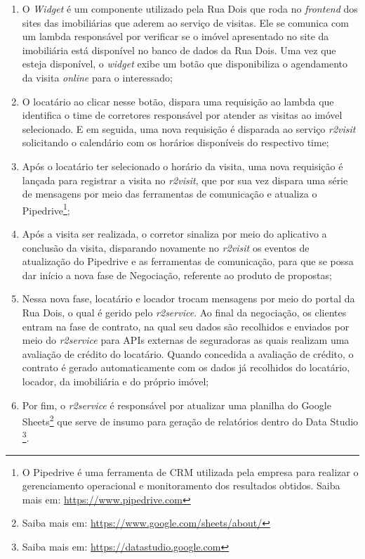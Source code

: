   \begin{enumerate}
    \item O \textit{Widget} é um componente utilizado pela Rua Dois que roda
      no \textit{frontend} dos sites das imobiliárias que aderem ao serviço
      de visitas. Ele se comunica com um lambda responsável por verificar se
      o imóvel apresentado no site da imobiliária está disponível no banco
      de dados da Rua Dois. Uma vez que esteja disponível, o \textit{widget}
      exibe um botão que disponibiliza o agendamento da visita \textit{online}
      para o interessado;
    \item O locatário ao clicar nesse botão, dispara uma requisição ao lambda
    que identifica o time de corretores responsável por atender as visitas
    ao imóvel selecionado. E em seguida, uma nova requisição é disparada ao
    serviço \textit{r2visit} solicitando o calendário com os horários
    disponíveis do respectivo time;
    \item Após o locatário ter selecionado o horário da visita, uma nova
    requisição é lançada para registrar a visita no \textit{r2visit}, que por
    sua vez dispara uma série de mensagens por meio das ferramentas de comunicação
    e atualiza o Pipedrive\footnote{O Pipedrive é uma ferramenta de \gls{CRM} utilizada pela
    empresa para realizar o gerenciamento operacional e monitoramento dos resultados obtidos.
    Saiba mais em: \url{https://www.pipedrive.com}};
    \item Após a visita ser realizada, o corretor sinaliza por meio do aplicativo
    a conclusão da visita, disparando novamente no \textit{r2visit} os eventos
    de atualização do Pipedrive e as ferramentas de comunicação, para que se
    possa dar início a nova fase de Negociação, referente ao produto de propostas;
    \item Nessa nova fase, locatário e locador trocam mensagens por meio do portal
    da Rua Dois, o qual é gerido pelo \textit{r2service}. Ao final da negociação,
    os clientes entram na fase de contrato, na qual seu dados são recolhidos e
    enviados por meio do \textit{r2service} para \glspl{API} externas de seguradoras as quais
    realizam uma avaliação de crédito do locatário. Quando concedida a avaliação
    de crédito, o contrato é gerado automaticamente com os dados já recolhidos
    do locatário, locador, da imobiliária e do próprio imóvel;
    \item Por fim, o \textit{r2service} é responsável por atualizar uma planilha do
    Google Sheets\footnote{Saiba mais em: \url{https://www.google.com/sheets/about/}}
    que serve de insumo para geração de relatórios dentro do Data Studio
    \footnote{Saiba mais em: \url{https://datastudio.google.com}}.
  \end{enumerate}

